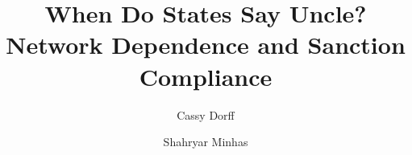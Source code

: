 \documentclass[12pt,onesided]{amsart}
\title[Network Dependence and Sanction Compliance]{When Do States Say Uncle? Network Dependence and Sanction Compliance}
\author[Dorff]{Cassy Dorff}
\author[Minhas]{Shahryar Minhas}
\begin{document}
\maketitle\thispagestyle{empty}

\begin{abstract}

\singlespacing{}

\end{abstract}

\newpage\setcounter{page}{1} 













\newpage


\end{document}

